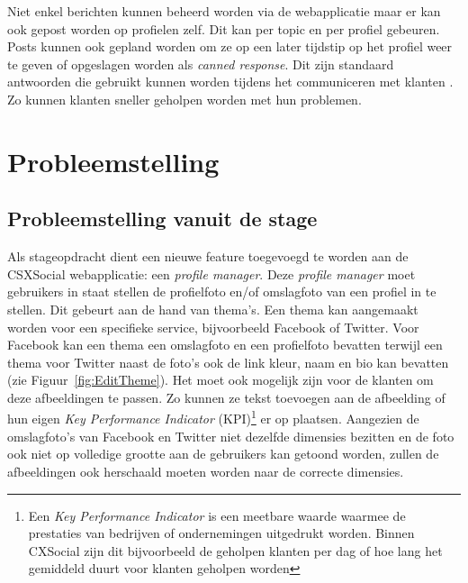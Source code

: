 Niet enkel berichten kunnen beheerd worden via de webapplicatie maar er kan ook gepost worden op profielen zelf. Dit kan per topic en per profiel gebeuren. Posts kunnen ook gepland worden om ze op een later tijdstip op het profiel weer te geven  of opgeslagen worden als \textit{canned response}. Dit zijn standaard antwoorden die gebruikt kunnen worden tijdens het communiceren met klanten \cite{EngagorApp}. Zo kunnen klanten sneller geholpen worden met hun problemen.
 
\chapter{Probleemstelling}
\vspace{-3cm}
\section{Probleemstelling vanuit de stage} \label{BeschrijvingStageOpdracht}

Als stageopdracht dient een nieuwe feature toegevoegd te worden aan de CSXSocial webapplicatie: een \textit{profile manager}. Deze \textit{profile manager} moet gebruikers in staat stellen de profielfoto en/of omslagfoto van een profiel in te stellen. Dit gebeurt aan de hand van thema's. Een thema kan aangemaakt worden voor een specifieke service, bijvoorbeeld Facebook of Twitter. Voor Facebook kan een thema een omslagfoto en een profielfoto bevatten terwijl een thema voor Twitter naast de foto's ook de link kleur, naam en bio kan bevatten (zie Figuur~\ref{fig:EditTheme}). Het moet ook mogelijk zijn voor de klanten om deze afbeeldingen te passen. Zo kunnen ze tekst toevoegen aan de afbeelding of hun eigen \textit{Key Performance Indicator} (KPI)\footnote{Een \textit{Key Performance Indicator} is een meetbare waarde waarmee de prestaties van bedrijven of ondernemingen uitgedrukt worden. Binnen CXSocial zijn dit bijvoorbeeld de geholpen klanten per dag of hoe lang het gemiddeld duurt voor klanten geholpen worden} er op plaatsen. Aangezien de omslagfoto's van Facebook en Twitter niet dezelfde dimensies bezitten en de foto ook niet op volledige grootte aan de gebruikers kan getoond worden, zullen de afbeeldingen ook herschaald moeten worden naar de correcte dimensies.

